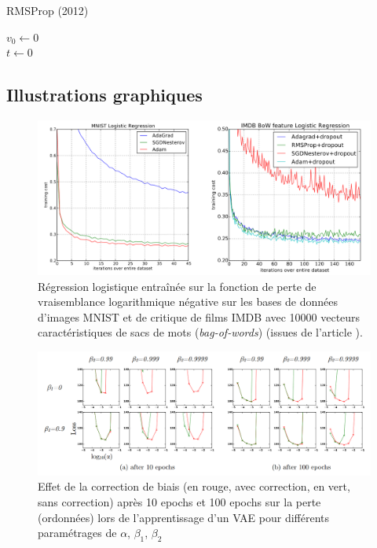 \documentclass[11pt,a4paper, french]{article}
\theoremstyle{definition}
\begin{document}
\begin{algorithm*}[h!]
  \caption{RMSProp (2012)}
  $v_0\longleftarrow 0$ \\  
  $t\longleftarrow 0$ \\
  \label{rmsprop}
\end{algorithm*}

\subsection{Illustrations graphiques}
\begin{figure}[H]
    \centering
    \includegraphics[width=16cm]{IMDB_MNIST_article.png}
    \caption{Régression logistique entraînée sur la fonction de perte de vraisemblance logarithmique négative sur les bases de données d'images MNIST et de critique de films IMDB avec 10000 vecteurs caractéristiques de sacs de mots (\textit{bag-of-words}) (issues de l'article \cite{kingma2017adammethodstochasticoptimization}).}
    \label{fig:IMDB}
\end{figure}

\begin{figure}[H]
    \centering
    \includegraphics[width=\linewidth]{bias_correction_article.png}
    \caption{Effet de la correction de biais (en rouge, avec correction, en vert, sans correction) après 10 epochs et 100 epochs sur la perte (ordonnées) lors de l'apprentissage d'un VAE pour différents paramétrages de $\alpha$, $\beta_1$, $\beta_2$}
    \label{biais}
\end{figure}
\end{document}
